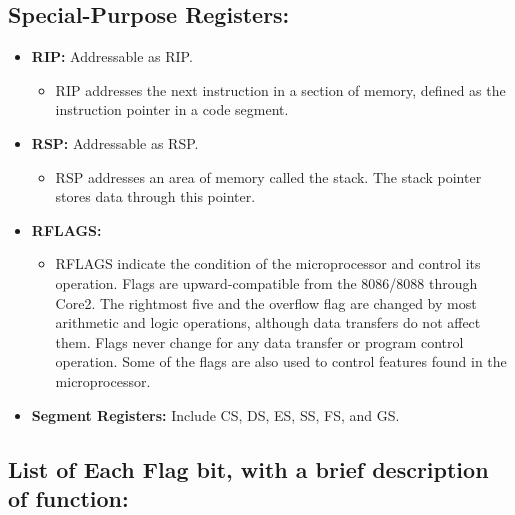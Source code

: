 \documentclass{article}
\begin{document}
\subsection*{Special-Purpose Registers:}

\begin{itemize}
    \item \textbf{RIP:} Addressable as RIP.
    \begin{itemize}
        \item RIP addresses the next instruction in a section of memory, defined as the instruction pointer in a code segment.
    \end{itemize}
    
    \item \textbf{RSP:} Addressable as RSP.
    \begin{itemize}
        \item RSP addresses an area of memory called the stack. The stack pointer stores data through this pointer.
    \end{itemize}
    
    \item \textbf{RFLAGS:} 
    \begin{itemize}
        \item RFLAGS indicate the condition of the microprocessor and control its operation. Flags are upward-compatible from the 8086/8088 through Core2. The rightmost five and the overflow flag are changed by most arithmetic and logic operations, although data transfers do not affect them. Flags never change for any data transfer or program control operation. Some of the flags are also used to control features found in the microprocessor.
    \end{itemize}
    
    \item \textbf{Segment Registers:} Include CS, DS, ES, SS, FS, and GS.
\end{itemize}

\subsection*{List of Each Flag bit, with a brief description of function:}
\end{document}
